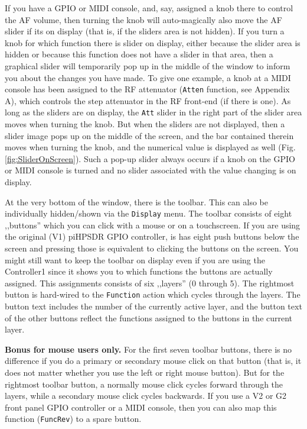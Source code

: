 \documentclass[12pt]{book}
\def\rett#1{\texttt{\color{red}#1}}
\def\bltt#1{\texttt{\color{blue}#1}}
\def\pH{pi\-HPSDR\xspace}
\begin{document}
If you have a GPIO or  MIDI  console, and, say, assigned
a knob there to control the AF volume, then turning the
knob will auto-magically also move the AF slider if its
on display (that is, if the sliders area is not hidden).
If you turn a knob for which function there is slider
on display, either because the slider area is hidden or
because this function does not have a slider in that area,
then a graphical slider will temporarily pop up in the
middle of the window to inform you about the changes
you have  made. To give one example, a knob at a
MIDI console has been assigned to the RF attenuator (\bltt{Atten}
function, see Appendix A), which controls the step
attenuator in the RF front-end (if there is one). As long
as the  sliders  are  on display, the \rett{Att} slider
in the right part of the slider area moves when turning
the knob. But when the sliders are not displayed, then a slider image
pops up  on the middle of the screen, and the
bar contained therein moves when turning the knob,
and the numerical value is displayed as well (Fig. \ref{fig:SliderOnScreen}).
Such a pop-up slider always occurs if a knob on the GPIO or MIDI
console is turned and no slider associated with the value changing is
on display.

At the very bottom of the window, there is the toolbar. This can also be
individually hidden/shown via the \bltt{Display} menu. The toolbar consists
of eight ,,buttons'' which you can click with a mouse or on a touchscreen.
If you are using the original (V1) \pH GPIO controller, is has eight
push buttons below the screen and pressing those is equivalent to clicking
the buttons on the screen. You might still want to keep the toolbar on display
even if you are using the Controller1 since it shows you to which functions
the buttons are actually assigned. This assignments consists of six ,,layers''
(0 through 5). The rightmost button is hard-wired to the \bltt{Function}
action which cycles through the layers. The button text includes the
number of the currently active layer, and the button text of the other buttons
reflect the functions assigned to the buttons in the current layer.

\textbf{Bonus for mouse users only.} For the first seven toolbar buttons,
there is no difference if you do a primary or secondary mouse click on that
button (that is, it does not matter whether you use the left or right mouse
button). But for the rightmost toolbar button, a normally mouse click cycles
forward through the layers, while a secondary mouse click cycles backwards.
If you use a V2 or G2 front panel GPIO controller or a MIDI console, then you
can also map this function (\bltt{FuncRev}) to a spare button.
\end{document}
